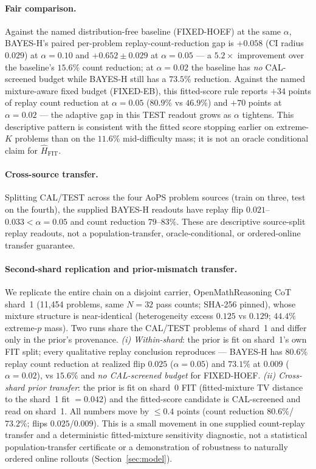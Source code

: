 \documentclass{article}
\theoremstyle{definition}
\theoremstyle{remark}
\begin{document}
\paragraph{Fair comparison.} Against the named distribution-free baseline
(FIXED-HOEF) at the same $\alpha$, BAYES-H's paired per-problem replay-count-reduction gap is
$+0.058$ (CI radius $0.029$) at $\alpha=0.10$ and $+0.652\pm0.029$ at
$\alpha=0.05$ --- a $5.2\times$ improvement over the baseline's $15.6\%$
count reduction; at $\alpha=0.02$ the baseline has \emph{no} CAL-screened budget while
BAYES-H still has a $73.5\%$ reduction. Against the named mixture-aware fixed budget
(FIXED-EB), this fitted-score rule reports $+34$ points of replay count reduction at $\alpha=0.05$
($80.9\%$ vs $46.9\%$) and $+70$ points at $\alpha=0.02$ --- the adaptive
gap in this TEST readout grows as $\alpha$ tightens. This descriptive pattern
is consistent with the fitted score stopping earlier on extreme-$K$ problems
than on the $11.6\%$ mid-difficulty mass; it is not an oracle conditional
claim for $\widehat H_{\mathrm{FIT}}$.

\paragraph{Cross-source transfer.} Splitting CAL/TEST across the four AoPS
problem sources (train on three, test on the fourth), the supplied BAYES-H
readouts have replay flip $0.021$--$0.033<\alpha=0.05$ and count reduction
$79$--$83\%$. These are descriptive source-split replay readouts, not a
population-transfer, oracle-conditional, or ordered-online transfer guarantee.

\paragraph{Second-shard replication and prior-mismatch transfer.}
We replicate the entire chain on a disjoint carrier, OpenMathReasoning CoT
shard~1 (11{,}454 problems, same $N{=}32$ pass counts; SHA-256 pinned), whose
mixture structure is near-identical (heterogeneity excess $0.125$ vs $0.129$;
$44.4\%$ extreme-$p$ mass). Two runs share the CAL/TEST problems of shard~1 and
differ only in the prior's provenance. \emph{(i) Within-shard}: the prior is
fit on shard~1's own FIT split; every qualitative replay conclusion reproduces ---
BAYES-H has $80.6\%$ replay count reduction at realized flip $0.025$ ($\alpha=0.05$) and $73.1\%$ at
$0.009$ ($\alpha=0.02$), vs $15.6\%$ and \emph{no CAL-screened budget} for
FIXED-HOEF. \emph{(ii) Cross-shard prior transfer}: the prior is fit on
shard~0 FIT (fitted-mixture TV distance to the shard~1 fit $=0.042$) and the
fitted-score candidate is CAL-screened and read on shard~1. All numbers move by $\le0.4$
points (count reduction $80.6\%$/$73.2\%$; flips $0.025$/$0.009$). This is a
small movement in one supplied count-replay transfer and a deterministic
fitted-mixture sensitivity diagnostic, not a statistical population-transfer
certificate or a demonstration of robustness to naturally ordered online
rollouts (Section~\ref{sec:model}).
\end{document}
